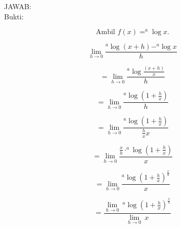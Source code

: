 \documentclass[a4paper,10pt]{article}
\begin{document}
\begin{eulernotebook}
\begin{eulercomment}
\begin{eulercomment}
\begin{eulercomment}
\begin{eulercomment}
\begin{eulercomment}
\begin{eulercomment}
\begin{eulercomment}
\begin{eulercomment}
\begin{eulercomment}
JAWAB:\\
Bukti:\\
\end{eulercomment}
\begin{eulerformula}
\[
\text{Ambil $f(x)=^a\log x$.}
\]
\end{eulerformula}
\begin{eulercomment}
\end{eulercomment}
\begin{eulerformula}
\[
\text{$\lim_{h\to 0} \frac{^a\log (x+h)-^a\log x}{h}$}
\]
\end{eulerformula}
\begin{eulercomment}
\end{eulercomment}
\begin{eulerformula}
\[
\text{$=\lim _{h\to 0} \frac{^a\log \frac{(x+h)}{x}}{h}$}
\]
\end{eulerformula}
\begin{eulercomment}
\end{eulercomment}
\begin{eulerformula}
\[
\text{$=\lim_{h\to 0} \frac{^a\log (1+\frac{h}{x})}{h}$}
\]
\end{eulerformula}
\begin{eulercomment}
\end{eulercomment}
\begin{eulerformula}
\[
\text{$=\lim_{h\to 0} \frac{^a\log (1+\frac{h}{x})}{\frac{h}{x}x}$}
\]
\end{eulerformula}
\begin{eulercomment}
\end{eulercomment}
\begin{eulerformula}
\[
\text{$=\lim_{h\to 0} \frac{\frac{x}{h}\cdot ^a\log (1+\frac{h}{x})}{x}$}
\]
\end{eulerformula}
\begin{eulercomment}
\end{eulercomment}
\begin{eulerformula}
\[
\text{$=\lim_{h\to 0} \frac{^a\log (1+\frac{h}{x})^\frac{x}{h}}{x}$}
\]
\end{eulerformula}
\begin{eulercomment}
\end{eulercomment}
\begin{eulerformula}
\[
\text{$=\frac{\lim_{h\to 0}\: ^a\log (1+\frac{h}{x})^\frac{x}{h}}{\lim _{h\to 0}\: x}$}
\]
\end{eulerformula}
\begin{eulercomment}
\end{eulercomment}

\end{eulercomment}
\end{eulercomment}
\end{eulercomment}
\end{eulercomment}
\end{eulercomment}
\end{eulercomment}
\end{eulercomment}
\end{eulercomment}
\end{eulernotebook}
\end{document}

